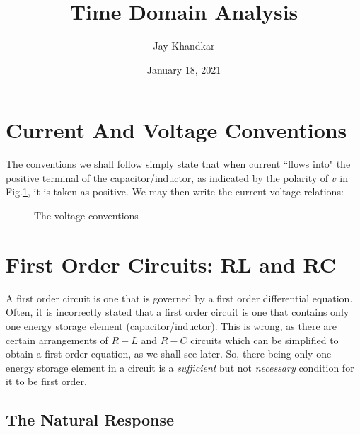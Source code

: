 \documentclass[12pt]{article}
\title{\textbf{Time Domain Analysis}}
\author{Jay Khandkar}
\date{January 18, 2021}
\numberwithin{equation}{section}
\newcommand*\widefbox[1]{\fbox{\hspace{2em}#1\hspace{2em}}}
\begin{document}

\newpage
\tableofcontents
\newpage
\begin{flushleft}
\color{blue}
\section{Current And Voltage Conventions}
\color{black}

The conventions we shall follow simply state that when 
current ``flows into" the positive terminal of the capacitor/inductor, as indicated by the polarity of $v$
in Fig.\ref{fig:conventions}, it is taken as positive. We may then write the current-voltage relations:


\begin{figure}[h!]
\centering
{}
\caption{The voltage conventions}
\label{fig:conventions}	
\end{figure}

\color{blue}
\section{First Order Circuits: RL and RC}
\color{black}
A first order circuit is one that is governed by a first order differential equation. Often, it is
incorrectly stated that a first order circuit is one that contains only one energy storage element
(capacitor/inductor). This is wrong, as there are certain arrangements of $R-L$ and $R-C$ circuits
which can be simplified to obtain a first order equation, as we shall see later. So, there being only
one energy storage element in a circuit is a \textit{sufficient} but not \textit{necessary} condition for
it to be first order.

\color{blue}
\subsection{The Natural Response}

\end{flushleft}
\end{document}
